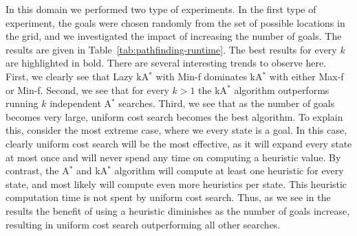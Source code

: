 \documentclass{aicom2e}
\newcommand{\astar}{A$^*$}
\newcommand{\kastar}{kA$^*$}
\newcommand{\minf}{Min-f}
\newcommand{\maxf}{Max-f}
\begin{document}
In this domain we performed two type of experiments. In the first type of experiment, the goals were chosen randomly from the set of possible locations in the grid, and we investigated the impact of increasing the number of goals. The results are given in Table~\ref{tab:pathfinding-runtime}. The best results for every $k$ are highlighted in bold. There are several interesting trends to observe here. First, we clearly see that Lazy \kastar{} with \minf{} dominates \kastar{} with either \maxf{} or \minf{}. Second, we see that for every $k>1$ the \kastar{} algorithm outperforms running $k$ independent \astar{} searches. Third, we see that as the number of goals becomes very large, uniform cost search becomes the best algorithm. To explain this, consider the most extreme case, where we every state is a goal. In this case, clearly uniform cost search will be the most effective, as it will expand every state at most once and will never spend any time on computing a heuristic value. By contrast, the \astar{} and \kastar{} algorithm will compute at least one heuristic for every state, and most likely will compute even more heuristics per state. This heuristic computation time is not spent by uniform cost search. Thus, as we see in the results the benefit of using a heuristic diminishes as the number of goals increase, resulting in uniform cost search outperforming all other searches. 



\end{document}
